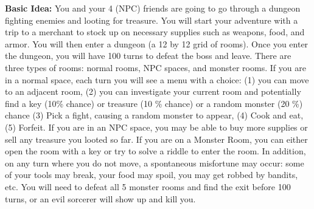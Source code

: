 \textbf{Basic Idea:} You and your 4 (NPC) friends are going to go through a dungeon fighting enemies and looting for treasure. You will start your adventure with a trip to a merchant to stock up on necessary supplies such as weapons, food, and armor. You will then enter a dungeon (a 12 by 12 grid of rooms). Once you enter the dungeon, you will have 100 turns to defeat the boss and leave. There are three types of rooms: normal rooms, NPC spaces, and monster rooms. If you are in a normal space, each turn you will see a menu with a choice: (1) you can move to an adjacent room, (2) you can investigate your current room and potentially find a key (10\% chance) or treasure (10 \% chance) or a random monster (20 \%) chance (3) Pick a fight, causing a random monster to appear, (4) Cook and eat, (5) Forfeit. If you are in an NPC space, you may be able to buy more supplies or sell any treasure you looted so far. If you are on a Monster Room, you can either open the room with a key or try to solve a riddle to enter the room. In addition, on any turn where you do not move, a spontaneous misfortune may occur: some of your tools may break, your food may spoil, you may get robbed by bandits, etc. You will need to defeat all 5 monster rooms and find the exit before 100 turns, or an evil sorcerer will show up and kill you. 

